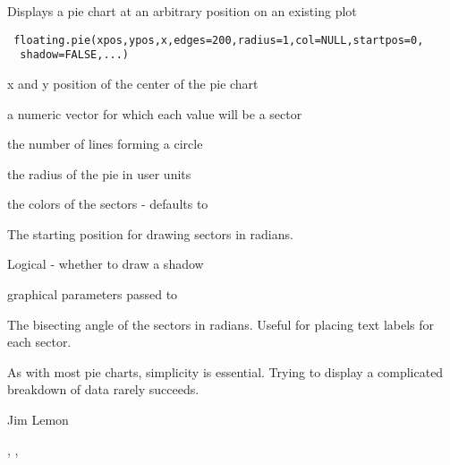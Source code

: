 \begin{Description}\relax
Displays a pie chart at an arbitrary position on an existing plot
\end{Description}
\begin{Usage}
\begin{verbatim}
 floating.pie(xpos,ypos,x,edges=200,radius=1,col=NULL,startpos=0,
  shadow=FALSE,...)
\end{verbatim}
\end{Usage}
\begin{Arguments}
\begin{ldescription}
\item[\code{xpos,ypos}] x and y position of the center of the pie chart
\item[\code{x}] a numeric vector for which each value will be a sector
\item[\code{edges}] the number of lines forming a circle
\item[\code{radius}] the radius of the pie in user units
\item[\code{col}] the colors of the sectors - defaults to 
\item[\code{startpos}] The starting position for drawing sectors in radians.
\item[\code{shadow}] Logical - whether to draw a shadow
\item[\code{...}] graphical parameters passed to 
\end{ldescription}
\end{Arguments}
\begin{Value}
The bisecting angle of the sectors in radians. Useful for placing
text labels for each sector.
\end{Value}
\begin{Note}\relax
As with most pie charts, simplicity is essential. Trying to display a
complicated breakdown of data rarely succeeds.
\end{Note}
\begin{Author}\relax
Jim Lemon
\end{Author}
\begin{SeeAlso}\relax
{}, ,
\end{SeeAlso}

